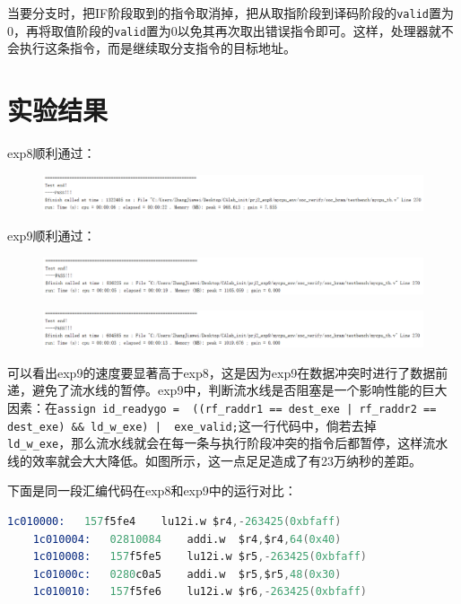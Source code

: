 \documentclass[UTF8]{report}
\begin{document}
当要分支时，把IF阶段取到的指令取消掉，把从取指阶段到译码阶段的\texttt{valid}置为0，再将取值阶段的\texttt{valid}置为0以免其再次取出错误指令即可。这样，处理器就不会执行这条指令，而是继续取分支指令的目标地址。

\section{实验结果}

exp8顺利通过：

\begin{figure}[H]
    \centering
    \includegraphics[width=\textwidth]{exp7.png}
\end{figure}

exp9顺利通过：

\begin{figure}[H]
    \centering
    \includegraphics[width=\textwidth]{exp8_1.png}
\end{figure}

\begin{figure}[H]
    \centering
    \includegraphics[width=\textwidth]{exp8_2.png}
\end{figure}

可以看出exp9的速度要显著高于exp8，这是因为exp9在数据冲突时进行了数据前递，避免了流水线的暂停。exp9中，判断流水线是否阻塞是一个影响性能的巨大因素：在\texttt{assign id_readygo = ~((rf_raddr1 == dest_exe | rf_raddr2 == dest_exe) \&\& ld_w_exe) | ~exe_valid;}这一行代码中，倘若去掉\\\texttt{ld\_w\_exe}，那么流水线就会在每一条与执行阶段冲突的指令后都暂停，这样流水线的效率就会大大降低。如图所示，这一点足足造成了有23万纳秒的差距。

下面是同一段汇编代码在exp8和exp9中的运行对比：

\begin{lstlisting}[language=s]
    1c010000:	157f5fe4 	lu12i.w	$r4,-263425(0xbfaff)
    1c010004:	02810084 	addi.w	$r4,$r4,64(0x40)
    1c010008:	157f5fe5 	lu12i.w	$r5,-263425(0xbfaff)
    1c01000c:	0280c0a5 	addi.w	$r5,$r5,48(0x30)
    1c010010:	157f5fe6 	lu12i.w	$r6,-263425(0xbfaff)    
\end{lstlisting}
\end{document}
